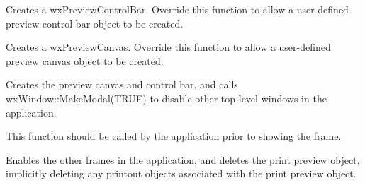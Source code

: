 Creates a wxPreviewControlBar. Override this function to allow
a user-defined preview control bar object to be created.



Creates a wxPreviewCanvas. Override this function to allow
a user-defined preview canvas object to be created.



Creates the preview canvas and control bar, and calls
wxWindow::MakeModal(TRUE) to disable other top-level windows
in the application.

This function should be called by the application prior to
showing the frame.



Enables the other frames in the application, and deletes the print preview
object, implicitly deleting any printout objects associated with the print
preview object.

